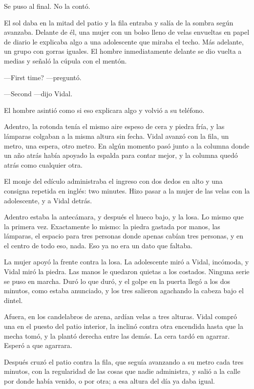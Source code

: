 Se puso al final. No la contó.

El sol daba en la mitad del patio y la fila entraba y salía de la sombra según avanzaba. Delante de él, una mujer con un bolso lleno de velas envueltas en papel de diario le explicaba algo a una adolescente que miraba el techo. Más adelante, un grupo con gorras iguales. El hombre inmediatamente delante se dio vuelta a medias y señaló la cúpula con el mentón.

---First time? ---preguntó.

---Second ---dijo Vidal.

El hombre asintió como si eso explicara algo y volvió a su teléfono.

Adentro, la rotonda tenía el mismo aire espeso de cera y piedra fría, y las lámparas colgaban a la misma altura sin fecha. Vidal avanzó con la fila, un metro, una espera, otro metro. En algún momento pasó junto a la columna donde un año atrás había apoyado la espalda para contar mejor, y la columna quedó atrás como cualquier otra.

El monje del edículo administraba el ingreso con dos dedos en alto y una consigna repetida en inglés: two minutes. Hizo pasar a la mujer de las velas con la adolescente, y a Vidal detrás.

Adentro estaba la antecámara, y después el hueco bajo, y la losa. Lo mismo que la primera vez. Exactamente lo mismo: la piedra gastada por manos, las lámparas, el espacio para tres personas donde apenas cabían tres personas, y en el centro de todo eso, nada. Eso ya no era un dato que faltaba.

La mujer apoyó la frente contra la losa. La adolescente miró a Vidal, incómoda, y Vidal miró la piedra. Las manos le quedaron quietas a los costados. Ninguna serie se puso en marcha. Duró lo que duró, y el golpe en la puerta llegó a los dos minutos, como estaba anunciado, y los tres salieron agachando la cabeza bajo el dintel.

Afuera, en los candelabros de arena, ardían velas a tres alturas. Vidal compró una en el puesto del patio interior, la inclinó contra otra encendida hasta que la mecha tomó, y la plantó derecha entre las demás. La cera tardó en agarrar. Esperó a que agarrara.

Después cruzó el patio contra la fila, que seguía avanzando a su metro cada tres minutos, con la regularidad de las cosas que nadie administra, y salió a la calle por donde había venido, o por otra; a esa altura del día ya daba igual.


